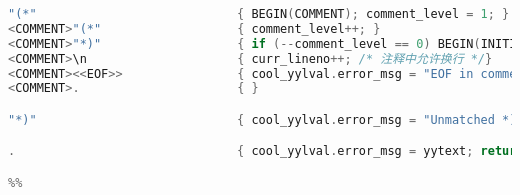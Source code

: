 \documentclass[a4paper,12pt]{article}
\begin{document}
\begin{lstlisting}[language=C]
"(*"                            { BEGIN(COMMENT); comment_level = 1; }
<COMMENT>"(*"                   { comment_level++; }
<COMMENT>"*)"                   { if (--comment_level == 0) BEGIN(INITIAL); }
<COMMENT>\n                     { curr_lineno++; /* 注释中允许换行 */}
<COMMENT><<EOF>>                { cool_yylval.error_msg = "EOF in comment"; BEGIN(INITIAL); return ERROR; }
<COMMENT>.                      { }

"*)"                            { cool_yylval.error_msg = "Unmatched *)"; return ERROR; }

.                               { cool_yylval.error_msg = yytext; return ERROR; }

%%

\end{lstlisting}
\end{document}
